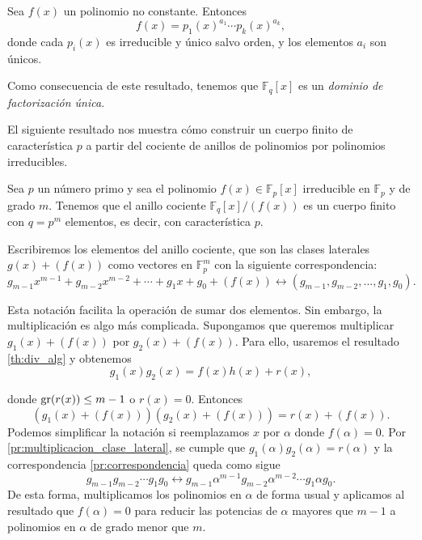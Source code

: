 \begin{theorem}
    Sea $f(x)$ un polinomio no constante. Entonces
    \[
        f(x) = p_1(x)^{a_1} \cdots p_k(x)^{a_k},
    \]
    donde cada $p_i(x)$ es irreducible y único salvo orden, y los elementos $a_i$ son únicos.
\end{theorem}

Como consecuencia de este resultado, tenemos que $\mathbb{F}_q[x]$ es un \emph{dominio de factorización única}.

El siguiente resultado nos muestra cómo construir un cuerpo finito de característica $p$ a partir del cociente de anillos de polinomios por polinomios irreducibles.

\begin{proposition}
    Sea $p$ un número primo y sea el polinomio $f(x) \in \mathbb{F}_p[x]$ irreducible en $\mathbb{F}_p$ y de grado $m$. Tenemos que el anillo cociente $\mathbb{F}_q[x]/\left(f(x)\right)$ es un cuerpo finito con $q = p^m$ elementos, es decir, con característica $p$.
\end{proposition}

Escribiremos los elementos del anillo cociente, que son las clases laterales $g(x) + (f(x))$ como vectores en $\mathbb{F}_p^m$ con la siguiente correspondencia:
\begin{equation}
    \label{pr:correspondencia}
    g_{m-1} x^{m-1} + g_{m-2} x^{m-2} + \cdots + g_{1} x + g_0 + (f(x)) \leftrightarrow (g_{m-1}, g_{m-2}, ..., g_1, g_0).
\end{equation}

Esta notación facilita la operación de sumar dos elementos. Sin embargo, la multiplicación es algo más complicada. Supongamos que queremos multiplicar $g_1(x) + (f(x))$ por $g_2(x) + (f(x))$. Para ello, usaremos el resultado \ref{th:div_alg} y obtenemos
\begin{equation}
    \label{pr:multiplicacion_clase_lateral}
    g_1(x) g_2(x) = f(x) h(x) + r(x),
\end{equation}

donde $\operatorname{gr}(r(x)) \leq m - 1$ o $r(x) = 0$. Entonces 
\[
    (g_1(x) + (f(x))) (g_2(x) + (f(x))) = r(x) + (f(x)).
\]
Podemos simplificar la notación si reemplazamos $x$ por $\alpha$ donde $f(\alpha) = 0$. Por \eqref{pr:multiplicacion_clase_lateral}, se cumple que $g_1(\alpha) g_2(\alpha) = r(\alpha)$ y la correspondencia \eqref{pr:correspondencia} queda como sigue
\[
    g_{m-1} g_{m-2} \cdots g_1 g_0 \leftrightarrow  g_{m-1} \alpha^{m-1} g_{m-2} \alpha^{m-2}\cdots g_1 \alpha g_0.
\]
De esta forma, multiplicamos los polinomios en $\alpha$ de forma usual y aplicamos al resultado que $f(\alpha) = 0$ para reducir las potencias de $\alpha$ mayores que $m-1$ a polinomios en $\alpha$ de grado menor que $m$.

